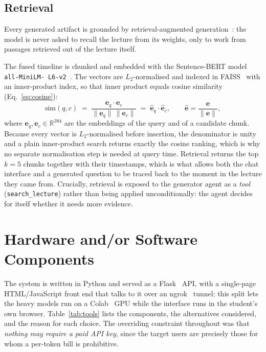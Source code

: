 \subsection{Retrieval}
\label{sec:meth-rag}

Every generated artifact is grounded by retrieval-augmented
generation~\cite{lewis2020rag,gao2023ragsurvey}: the model is never asked to
recall the lecture from its weights, only to work from passages retrieved out of
the lecture itself.

The fused timeline is chunked and embedded with the Sentence-BERT
model~\cite{reimers2019sbert} \texttt{all-\allowbreak MiniLM-\allowbreak
L6-\allowbreak v2}~\cite{wang2020minilm}. The vectors are $L_2$-normalised and
indexed in FAISS~\cite{johnson2019faiss} with an inner-product index, so that
inner product equals cosine similarity (Eq.~\ref{eq:cosine}):
\begin{equation}
\label{eq:cosine}
\mathrm{sim}(q, c) \;=\;
  \frac{\mathbf{e}_q \cdot \mathbf{e}_c}
       {\lVert \mathbf{e}_q \rVert \, \lVert \mathbf{e}_c \rVert}
  \;=\; \hat{\mathbf{e}}_q \cdot \hat{\mathbf{e}}_c ,
  \qquad
  \hat{\mathbf{e}} = \frac{\mathbf{e}}{\lVert \mathbf{e} \rVert},
\end{equation}
where $\mathbf{e}_q, \mathbf{e}_c \in \mathbb{R}^{384}$ are the embeddings of the
query and of a candidate chunk. Because every vector is $L_2$-normalised before
insertion, the denominator is unity and a plain inner-product search returns exactly
the cosine ranking, which is why no separate normalisation step is needed at query
time. Retrieval returns the top
$k = 5$ chunks together with their timestamps, which is what allows both the chat
interface and a generated question to be traced back to the moment in the lecture
they came from. Crucially, retrieval is exposed to the generator agent as a
\emph{tool} (\texttt{search\_lecture}) rather than being applied unconditionally:
the agent decides for itself whether it needs more evidence.

\section{Hardware and/or Software Components}
\label{sec:meth-components}

The system is written in Python and served as a Flask~\cite{flask} API, with a single-page
HTML/JavaScript front end that talks to it over an ngrok~\cite{ngrok} tunnel; this split lets the
heavy models run on a Colab~\cite{colab} GPU while the interface runs in the student's own
browser. Table~\ref{tab:tools} lists the components, the alternatives considered,
and the reason for each choice. The overriding constraint throughout was that
\emph{nothing may require a paid API key}, since the target users are precisely
those for whom a per-token bill is prohibitive.

